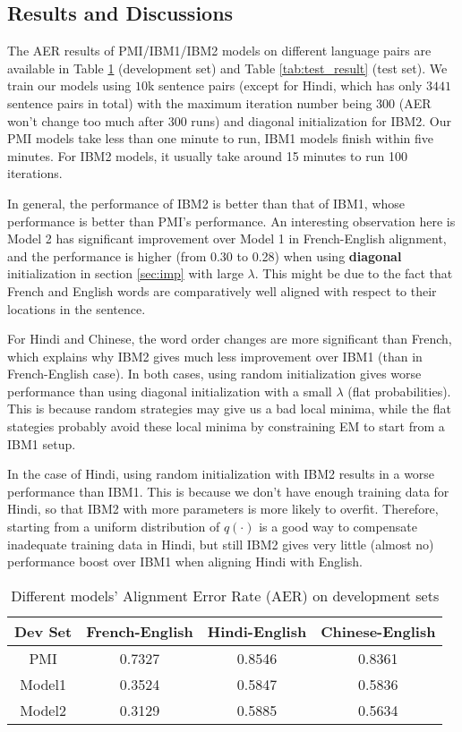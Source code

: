\documentclass[letterpaper]{article}
\begin{document}
\subsection{Results and Discussions}\label{sec:result}
The AER results of PMI/IBM1/IBM2 models on different language pairs are available in Table \ref{tab:dev_result} (development set) and Table \ref{tab:test_result}  (test set). We train our models using $10$k sentence pairs (except for Hindi, which has only $3441$ sentence pairs in total) with the maximum iteration number being $300$ (AER won't change too much after $300$ runs) and diagonal initialization for IBM2.
Our PMI models take less than one minute to run, IBM1 models finish within five minutes. For IBM2 models, it usually take around 15 minutes to run 100 iterations.

In general, the performance of IBM2 is better than that of IBM1, whose performance is better than PMI's performance.
An interesting observation here is Model 2 has significant improvement over Model 1 in French-English alignment, and the performance is higher (from 0.30 to 0.28) when using \textbf{diagonal} initialization in section \ref{sec:imp} with large $\lambda$. This might be due to the fact that French and English words are comparatively well aligned with respect to their locations in the sentence.

For Hindi and Chinese, the word order changes are more significant than French, which explains why IBM2 gives much less improvement over IBM1 (than in French-English case). In both cases, using random initialization gives worse performance than using diagonal initialization with a small $\lambda$ (flat probabilities). This is because random strategies may give us a bad local minima, while the flat stategies probably avoid these local minima by constraining EM to start from a IBM1 setup.

In the case of Hindi, using random initialization with IBM2 results in a worse performance than IBM1. This is because we don't have enough training data for Hindi, so that IBM2 with more parameters is more likely to overfit.
Therefore, starting from a uniform distribution of $q(\cdot)$ is a good way to compensate inadequate training data in Hindi, but still IBM2 gives very little (almost no) performance boost over IBM1 when aligning Hindi with English.

\begin{table}
\begin{center}
\begin{tabular}{cccc}
\hline
\textbf{Dev Set} & French-English & Hindi-English & Chinese-English \\
\hline
PMI & 0.7327 & 0.8546 & 0.8361 \\
Model1 & 0.3524 &  0.5847 &  0.5836 \\
Model2 & 0.3129 & 0.5885 & 0.5634 \\
\hline
\end{tabular}
\caption{Different models' Alignment Error Rate (AER) on development sets}\label{tab:dev_result}
\end{center}
\end{table}
\end{document}
